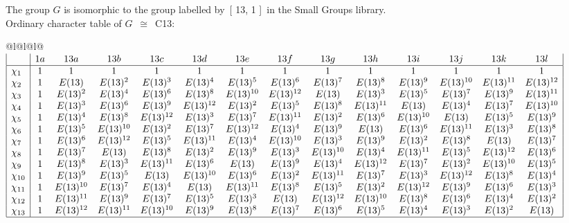 \documentclass[varwidth=\maxdimen,border=10]{standalone}
\begin{document}
The group $G$ is isomorphic to the group labelled by\ [ 13, 1 ]\ in the Small Groups library.\\
Ordinary character table of $G$\ $\cong$\ C13:\\
\begin{center}
\begin{tabular}{@{}l@{}l@{}l@{}}
\hline
\(\begin{array}{|l|ccccccccccccc|}
  & 1a & 13a & 13b & 13c & 13d & 13e & 13f & 13g & 13h & 13i & 13j & 13k & 13l\\ \hline
\chi_{1} & 1 & 1 & 1 & 1 & 1 & 1 & 1 & 1 & 1 & 1 & 1 & 1 & 1\\
\chi_{2} & 1 & E(13) & E(13)^{2} & E(13)^{3} & E(13)^{4} & E(13)^{5} & E(13)^{6} & E(13)^{7} & E(13)^{8} & E(13)^{9} & E(13)^{10} & E(13)^{11} & E(13)^{12}\\
\chi_{3} & 1 & E(13)^{2} & E(13)^{4} & E(13)^{6} & E(13)^{8} & E(13)^{10} & E(13)^{12} & E(13) & E(13)^{3} & E(13)^{5} & E(13)^{7} & E(13)^{9} & E(13)^{11}\\
\chi_{4} & 1 & E(13)^{3} & E(13)^{6} & E(13)^{9} & E(13)^{12} & E(13)^{2} & E(13)^{5} & E(13)^{8} & E(13)^{11} & E(13) & E(13)^{4} & E(13)^{7} & E(13)^{10}\\
\chi_{5} & 1 & E(13)^{4} & E(13)^{8} & E(13)^{12} & E(13)^{3} & E(13)^{7} & E(13)^{11} & E(13)^{2} & E(13)^{6} & E(13)^{10} & E(13) & E(13)^{5} & E(13)^{9}\\
\chi_{6} & 1 & E(13)^{5} & E(13)^{10} & E(13)^{2} & E(13)^{7} & E(13)^{12} & E(13)^{4} & E(13)^{9} & E(13) & E(13)^{6} & E(13)^{11} & E(13)^{3} & E(13)^{8}\\
\chi_{7} & 1 & E(13)^{6} & E(13)^{12} & E(13)^{5} & E(13)^{11} & E(13)^{4} & E(13)^{10} & E(13)^{3} & E(13)^{9} & E(13)^{2} & E(13)^{8} & E(13) & E(13)^{7}\\
\chi_{8} & 1 & E(13)^{7} & E(13) & E(13)^{8} & E(13)^{2} & E(13)^{9} & E(13)^{3} & E(13)^{10} & E(13)^{4} & E(13)^{11} & E(13)^{5} & E(13)^{12} & E(13)^{6}\\
\chi_{9} & 1 & E(13)^{8} & E(13)^{3} & E(13)^{11} & E(13)^{6} & E(13) & E(13)^{9} & E(13)^{4} & E(13)^{12} & E(13)^{7} & E(13)^{2} & E(13)^{10} & E(13)^{5}\\
\chi_{10} & 1 & E(13)^{9} & E(13)^{5} & E(13) & E(13)^{10} & E(13)^{6} & E(13)^{2} & E(13)^{11} & E(13)^{7} & E(13)^{3} & E(13)^{12} & E(13)^{8} & E(13)^{4}\\
\chi_{11} & 1 & E(13)^{10} & E(13)^{7} & E(13)^{4} & E(13) & E(13)^{11} & E(13)^{8} & E(13)^{5} & E(13)^{2} & E(13)^{12} & E(13)^{9} & E(13)^{6} & E(13)^{3}\\
\chi_{12} & 1 & E(13)^{11} & E(13)^{9} & E(13)^{7} & E(13)^{5} & E(13)^{3} & E(13) & E(13)^{12} & E(13)^{10} & E(13)^{8} & E(13)^{6} & E(13)^{4} & E(13)^{2}\\
\chi_{13} & 1 & E(13)^{12} & E(13)^{11} & E(13)^{10} & E(13)^{9} & E(13)^{8} & E(13)^{7} & E(13)^{6} & E(13)^{5} & E(13)^{4} & E(13)^{3} & E(13)^{2} & E(13)\\
\hline
\end{array}\)\\
\end{tabular}
\end{center}
\end{document}
